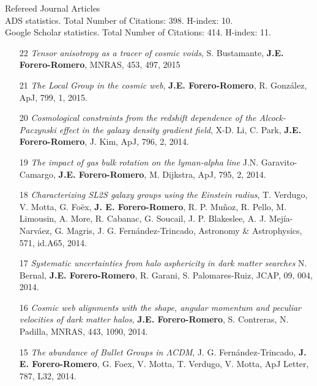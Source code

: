 \documentclass[letterpaper,11pt,onecolumn]{article}
\begin{document}
\indent
Refereed Journal Articles\\

\noindent 
ADS statistics. Total Number of Citations: 398. H-index: 10.\\
Google Scholar statistics. Total Number of Citations: 414. H-index: 11.\\
\begin{enumerate}

\item[22]{\it Tensor anisotropy as a tracer of cosmic voids},
  S. Bustamante, {\bf   J.E. Forero-Romero}, MNRAS, 453,
  497, 2015

\item[21]{\it The Local Group in the cosmic web}, {\bf
  J.E. Forero-Romero}, R. Gonz\'alez, ApJ, 799, 1, 2015.

\item[20]{\it Cosmological constraints from the redshift dependence of
  the Alcock-Paczynski effect in the galaxy density gradient field},
  X-D. Li, C. Park, {\bf J.E. Forero-Romero}, J. Kim, ApJ, 796, 2,
  2014.


\item[19]{\it The impact of gas bulk rotation on the lyman-alpha line}
  J.N. Garavito-Camargo,  {\bf J.E. Forero-Romero}, M. Dijkstra, ApJ,
  795, 2, 2014. 
 

\item[18]{\it  Characterizing SL2S galaxy groups using the Einstein
  radius}, T. Verdugo, V. Motta, G. Fo\"ex, {\bf J. E. Forero-Romero},
  R. P. Mu\~noz, R. Pello, M. Limousin, A. More, R. Cabanac, G. Soucail,
  J. P. Blakeslee, A. J. Mej\'ia-Narv\'aez, G. Magris,
  J. G. Fern\'andez-Trincado, Astronomy \& Astrophysics, 571, id.A65, 2014.


\item[17]{\it Systematic uncertainties from halo asphericity in dark
  matter searches}  N. Bernal, {\bf J.E. Forero-Romero}, R. Garani,
  S. Palomares-Ruiz, JCAP, 09, 004, 2014.

\item[16]{\it Cosmic web alignments with the shape, angular momentum
  and peculiar velocities of dark matter halos}, 
  {\bf J.E. Forero-Romero}, S. Contreras, N. Padilla, MNRAS, 443,
  1090, 2014. 

\item[15]{\it The abundance of Bullet Groups in $\Lambda$CDM},
  J. G. Fern\'andez-Trincado, {\bf J. E. Forero-Romero}, G. Foex,
  V. Motta, T. Verdugo, V. Motta, ApJ Letter, 787, L32, 2014.


\end{enumerate}
\end{document}
